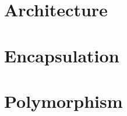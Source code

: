 \documentclass[b5paper,openany]{book}
\begin{document}
\chapter{Architecture}


\chapter{Encapsulation}


\chapter{Polymorphism}






\end{document}
